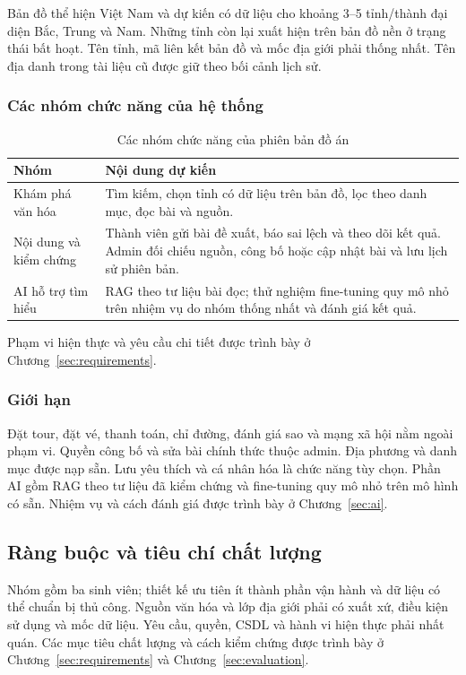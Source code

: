 Bản đồ thể hiện Việt Nam và dự kiến có dữ liệu cho khoảng 3--5 tỉnh/thành
đại diện Bắc, Trung và Nam. Những tỉnh còn lại xuất hiện trên bản đồ nền
ở trạng thái bất hoạt. Tên tỉnh, mã liên kết bản đồ và mốc địa giới phải
thống nhất. Tên địa danh trong tài liệu cũ được giữ theo bối cảnh lịch sử.

\subsubsection{Các nhóm chức năng của hệ thống}
\begin{longtable}{|L{33mm}|L{111mm}|}
\caption{Các nhóm chức năng của phiên bản đồ án}\label{tab:scope}\\\hline
{}\textbf{Nhóm} & \textbf{Nội dung dự kiến}\\\hline
Khám phá văn hóa & Tìm kiếm, chọn tỉnh có dữ liệu trên bản đồ, lọc theo danh mục, đọc bài và nguồn.\\\hline
Nội dung và kiểm chứng & Thành viên gửi bài đề xuất, báo sai lệch và theo dõi kết quả. Admin đối chiếu nguồn, công bố hoặc cập nhật bài và lưu lịch sử phiên bản.\\\hline
AI hỗ trợ tìm hiểu & RAG theo tư liệu bài đọc; thử nghiệm fine-tuning quy mô nhỏ trên nhiệm vụ do nhóm thống nhất và đánh giá kết quả.\\\hline
\end{longtable}
Phạm vi hiện thực và yêu cầu chi tiết được trình bày ở Chương~\ref{sec:requirements}.

\subsubsection{Giới hạn}
Đặt tour, đặt vé, thanh toán, chỉ đường, đánh giá sao và mạng xã hội nằm
ngoài phạm vi. Quyền công bố và sửa bài chính thức thuộc admin. Địa phương
và danh mục được nạp sẵn. Lưu yêu thích và cá nhân hóa là chức năng tùy
chọn. Phần AI gồm RAG theo tư liệu đã kiểm chứng và fine-tuning quy mô nhỏ
trên mô hình có sẵn. Nhiệm vụ và cách đánh giá được trình bày ở
Chương~\ref{sec:ai}.

\subsection{Ràng buộc và tiêu chí chất lượng}
Nhóm gồm ba sinh viên; thiết kế ưu tiên ít thành phần vận hành và dữ liệu
có thể chuẩn bị thủ công. Nguồn văn hóa và lớp địa giới phải có xuất xứ,
điều kiện sử dụng và mốc dữ liệu. Yêu cầu, quyền, CSDL và hành vi hiện thực
phải nhất quán. Các mục tiêu chất lượng và cách kiểm chứng được trình bày ở
Chương~\ref{sec:requirements} và Chương~\ref{sec:evaluation}.

